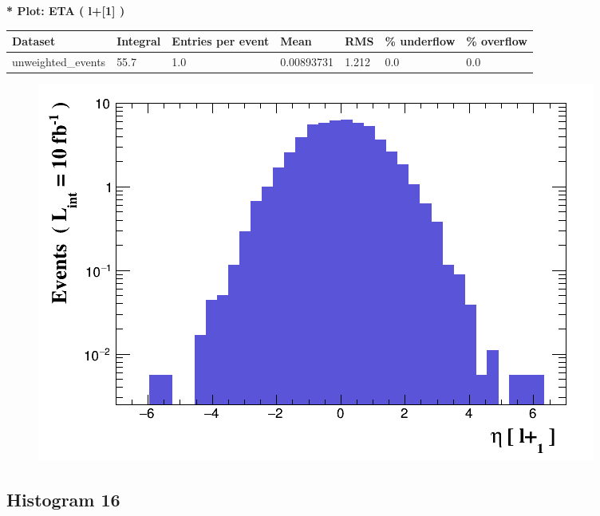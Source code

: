 \documentclass[a4paper, 10pt]{article}
\begin{document}
\textbf{* Plot: ETA ( l+[1] ) }\\
   \begin{table}[H]
  \begin{center}
    \begin{tabular}{|m{23.0mm}|m{23.0mm}|m{18.0mm}|m{19.0mm}|m{19.0mm}|m{19.0mm}|m{19.0mm}|}
      \hline
      {\cellcolor{yellow}         Dataset}& {\cellcolor{yellow}         Integral}& {\cellcolor{yellow}         Entries per event}& {\cellcolor{yellow}         Mean}& {\cellcolor{yellow}         RMS}& {\cellcolor{yellow}         \% underflow}& {\cellcolor{yellow}         \% overflow}\\
      \hline
      {\cellcolor{white}         unweighted\_events}& {\cellcolor{white}         55.7}& {\cellcolor{white}         1.0}& {\cellcolor{white}         0.00893731}& {\cellcolor{white}         1.212}& {\cellcolor{green}         0.0}& {\cellcolor{green}         0.0}\\
\hline
    \end{tabular}
  \end{center}
\end{table}

\begin{figure}[H]
  \begin{center}
    \includegraphics[scale=0.45]{selection_14.png}\\
\caption{   }
  \end{center}
\end{figure}
      \newpage
\subsection{ Histogram 16}
\end{document}
